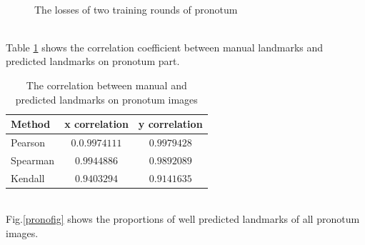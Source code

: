 \documentclass[12pt,a4paper]{article}
\begin{document}
\begin{figure}[h!]
\centering
{}~~
\caption{The losses of two training rounds of pronotum}
\label{losspronotumcurves}
\end{figure}~\\
Table \ref{corrprono} shows the correlation coefficient between manual landmarks and predicted landmarks on pronotum part.
\begin{table}[h!]
	\centering
	\begin{tabular}{l c c}
		Method & x correlation & y correlation \\ \hline
		Pearson & $0.0.9974111$ & $0.9979428$ \\ \hline
		Spearman & $0.9944886$ & $0.9892089$ \\ \hline
		Kendall & $0.9403294$ & $0.9141635$ \\ \hline
	\end{tabular}
	\caption{The correlation between manual and predicted landmarks on pronotum images}
	\label{corrprono}
\end{table}~\\
Fig.\ref{pronofig} shows the proportions of well predicted landmarks of all pronotum images.
\end{document}
